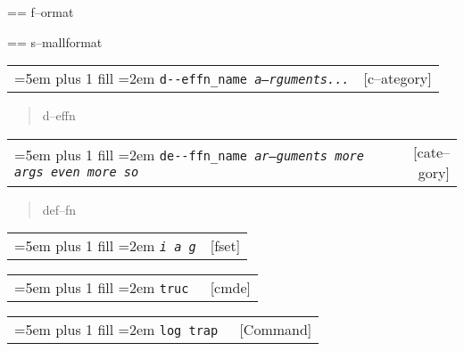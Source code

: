 \documentclass{book}
\makeatletter
\newcommand\GNUTexinfocommandstyletextvar[1]{{\normalfont{}\textsl{#1}}}%
\newenvironment{GNUTexinfopreformatted}{%
  \par\GNUTobeylines\obeyspaces\frenchspacing
  \parskip=\z@\parindent=\z@}{}
{\catcode`\^^M=13 \gdef\GNUTobeylines{\catcode`\^^M=13 \def^^M{\null\par}}}
\makeatother
\begin{document}
\begin{GNUTexinfopreformatted}%
f--ormat
\end{GNUTexinfopreformatted}

\begin{GNUTexinfopreformatted}%
\footnotesize s--mallformat
\end{GNUTexinfopreformatted}


\noindent\begin{tabularx}{\linewidth}{@{}Xr}
\rightskip=5em plus 1 fill
\hangindent=2em
\texttt{d{-}{-}effn\_name \EmbracOn{}\textnormal{\textsl{a--rguments...}}\EmbracOff{}}& [c--ategory]
\end{tabularx}

%
\begin{quote}
\unskip{\parskip=0pt\noindent}%
d--effn
\end{quote}


\noindent\begin{tabularx}{\linewidth}{@{}Xr}
\rightskip=5em plus 1 fill
\hangindent=2em
\texttt{de{-}{-}ffn\_name \EmbracOn{}\textnormal{\textsl{ar--guments    more args   even more so}}\EmbracOff{}}& [cate--gory]
\end{tabularx}

%
\begin{quote}
\unskip{\parskip=0pt\noindent}%
def--fn
\end{quote}


\noindent\begin{tabularx}{\linewidth}{@{}Xr}
\rightskip=5em plus 1 fill
\hangindent=2em
\texttt{\GNUTexinfocommandstyletextvar{i} \EmbracOn{}\textnormal{\textsl{a g}}\EmbracOff{}}& [fset]
\end{tabularx}

\index[fn]{i@\texttt{\GNUTexinfocommandstyletextvar{i}}}%
%

\noindent\begin{tabularx}{\linewidth}{@{}Xr}
\rightskip=5em plus 1 fill
\hangindent=2em
\texttt{truc \EmbracOn{}\textnormal{\textsl{}}\EmbracOff{}}& [cmde]
\end{tabularx}

%

\noindent\begin{tabularx}{\linewidth}{@{}Xr}
\rightskip=5em plus 1 fill
\hangindent=2em
\texttt{log trap \EmbracOn{}\textnormal{\textsl{}}\EmbracOff{}}& [Command]
\end{tabularx}
\end{document}

